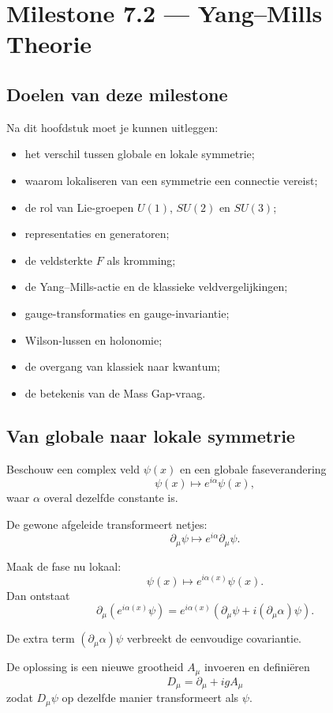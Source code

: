 \documentclass[11pt,a4paper]{article}
\begin{document}
\newpage
\section{Milestone 7.2 --- Yang--Mills Theorie}

\subsection{Doelen van deze milestone}
Na dit hoofdstuk moet je kunnen uitleggen:
\begin{itemize}
    \item het verschil tussen globale en lokale symmetrie;
    \item waarom lokaliseren van een symmetrie een connectie vereist;
    \item de rol van Lie-groepen $U(1)$, $SU(2)$ en $SU(3)$;
    \item representaties en generatoren;
    \item de veldsterkte $F$ als kromming;
    \item de Yang--Mills-actie en de klassieke veldvergelijkingen;
    \item gauge-transformaties en gauge-invariantie;
    \item Wilson-lussen en holonomie;
    \item de overgang van klassiek naar kwantum;
    \item de betekenis van de Mass Gap-vraag.
\end{itemize}

\subsection{Van globale naar lokale symmetrie}

Beschouw een complex veld $\psi(x)$ en een globale faseverandering
\[
\psi(x)\mapsto e^{i\alpha}\psi(x),
\]
waar $\alpha$ overal dezelfde constante is.

De gewone afgeleide transformeert netjes:
\[
\partial_\mu\psi\mapsto e^{i\alpha}\partial_\mu\psi.
\]

Maak de fase nu lokaal:
\[
\psi(x)\mapsto e^{i\alpha(x)}\psi(x).
\]
Dan ontstaat
\[
\partial_\mu(e^{i\alpha(x)}\psi)
=e^{i\alpha(x)}\left(\partial_\mu\psi+i(\partial_\mu\alpha)\psi\right).
\]

De extra term $(\partial_\mu\alpha)\psi$ verbreekt de eenvoudige covariantie.

De oplossing is een nieuwe grootheid $A_\mu$ invoeren en definiëren
\[
D_\mu=\partial_\mu+igA_\mu
\]
zodat $D_\mu\psi$ op dezelfde manier transformeert als $\psi$.
\end{document}
